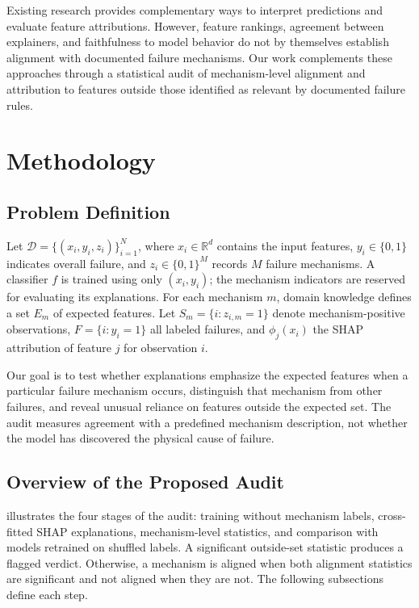 \documentclass[conference]{IEEEtran}
\begin{document}
Existing research provides complementary ways to interpret predictions and evaluate feature attributions. However, feature rankings, agreement between explainers, and faithfulness to model behavior do not by themselves establish alignment with documented failure mechanisms. Our work complements these approaches through a statistical audit of mechanism-level alignment and attribution to features outside those identified as relevant by documented failure rules.



\section{Methodology}
\label{sec:method}

\subsection{Problem Definition}
\label{sec:background}

Let $\mathcal{D}=\{(x_i,y_i,z_i)\}_{i=1}^{N}$, where $x_i\in\mathbb{R}^{d}$ contains the input features, $y_i\in\{0,1\}$ indicates overall failure, and $z_i\in\{0,1\}^{M}$ records $M$ failure mechanisms. A classifier $f$ is trained using only $(x_i,y_i)$; the mechanism indicators are reserved for evaluating its explanations. For each mechanism $m$, domain knowledge defines a set $E_m$ of expected features. Let $S_m=\{i:z_{i,m}=1\}$ denote mechanism-positive observations, $F=\{i:y_i=1\}$ all labeled failures, and $\phi_j(x_i)$ the SHAP attribution of feature $j$ for observation $i$.

Our goal is to test whether explanations emphasize the expected features when a particular failure mechanism occurs, distinguish that mechanism from other failures, and reveal unusual reliance on features outside the expected set. The audit measures agreement with a predefined mechanism description, not whether the model has discovered the physical cause of failure.


\subsection{Overview of the Proposed Audit}



 illustrates the four stages of the audit: training without mechanism labels, cross-fitted SHAP explanations, mechanism-level statistics, and comparison with models retrained on shuffled labels. A significant outside-set statistic produces a flagged verdict. Otherwise, a mechanism is aligned when both alignment statistics are significant and not aligned when they are not. The following subsections define each step.
\end{document}
